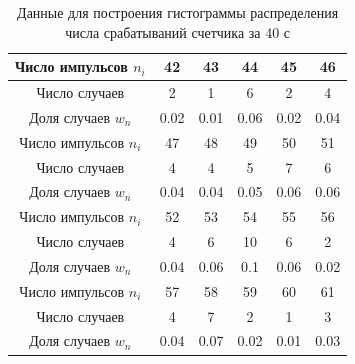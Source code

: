 \documentclass[a4paper,12pt]{article}
\begin{document}
\begin{table}[H]
\centering
\caption{Данные для построения гистограммы распределения числа срабатываний счетчика за 40 с} \label{40c}
\begin{tabular}{|c|c|c|c|c|c|}
\hline 
Число импульсов $n_i$ & 42 & 43 & 44 & 45 & 46\\ 
\hline 
Число случаев & 2 & 1 & 6 & 2 & 4 \\ 
\hline 
Доля случаев $w_n$ & 0.02 & 0.01 & 0.06 & 0.02 & 0.04 \\ 
\hline 
\hline 
Число импульсов $n_i$ & 47 & 48 & 49 & 50 & 51\\ 
\hline 
Число случаев & 4 & 4 & 5 & 7 & 6 \\ 
\hline 
Доля случаев $w_n$ & 0.04 & 0.04 & 0.05 & 0.06 & 0.06 \\ 
\hline 
\hline 
Число импульсов $n_i$ & 52 & 53 & 54 & 55 & 56\\ 
\hline 
Число случаев & 4 & 6 & 10 & 6 & 2 \\ 
\hline 
Доля случаев $w_n$ & 0.04 & 0.06 & 0.1 & 0.06 & 0.02 \\ 
\hline 
\hline
Число импульсов $n_i$ & 57 & 58 & 59 & 60 & 61\\ 
\hline 
Число случаев & 4 & 7 & 2 & 1 & 3 \\ 
\hline 
Доля случаев $w_n$ & 0.04 & 0.07 & 0.02 & 0.01 & 0.03 \\ 
 
\hline 

\end{tabular} 
\end{table}
\end{document}
